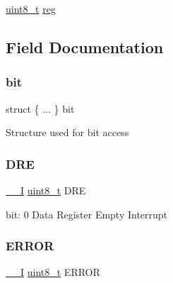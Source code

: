 \begin{DoxyCompactItemize}
\begin{tabbing}
\end{tabbing}\item 
\mbox{\hyperlink{union_s_e_r_c_o_m___s_p_i___i_n_t_f_l_a_g___type_a5b4208c6f4c4a4290c4f2804d1eb1d5b}{uint8\+\_\+t}} \mbox{\hyperlink{union_s_e_r_c_o_m___s_p_i___i_n_t_f_l_a_g___type_a9428adc9af4653a2050e2536b55dec8d}{reg}}
\end{DoxyCompactItemize}


\subsection{Field Documentation}
\mbox{\label{union_s_e_r_c_o_m___s_p_i___i_n_t_f_l_a_g___type_ad0e33a656c9c3f1d9300a94ba8ba2f3f}} 
\subsubsection{\texorpdfstring{bit}{bit}}
{\footnotesize\ttfamily struct \{ ... \}   bit}

Structure used for bit access \mbox{\label{union_s_e_r_c_o_m___s_p_i___i_n_t_f_l_a_g___type_a3e0c17296e30aaa4ad96a7effe9a00b0}} 
\subsubsection{\texorpdfstring{DRE}{DRE}}
{\footnotesize\ttfamily \mbox{\hyperlink{core__cm0plus_8h_af63697ed9952cc71e1225efe205f6cd3}{\+\_\+\+\_\+I}} \mbox{\hyperlink{union_s_e_r_c_o_m___s_p_i___i_n_t_f_l_a_g___type_a5b4208c6f4c4a4290c4f2804d1eb1d5b}{uint8\+\_\+t}} D\+RE}

bit\+: 0 Data Register Empty Interrupt \mbox{\label{union_s_e_r_c_o_m___s_p_i___i_n_t_f_l_a_g___type_ab083f63120ce20369e2dbb0081da16e3}} 
\subsubsection{\texorpdfstring{ERROR}{ERROR}}
{\footnotesize\ttfamily \mbox{\hyperlink{core__cm0plus_8h_af63697ed9952cc71e1225efe205f6cd3}{\+\_\+\+\_\+I}} \mbox{\hyperlink{union_s_e_r_c_o_m___s_p_i___i_n_t_f_l_a_g___type_a5b4208c6f4c4a4290c4f2804d1eb1d5b}{uint8\+\_\+t}} E\+R\+R\+OR}


